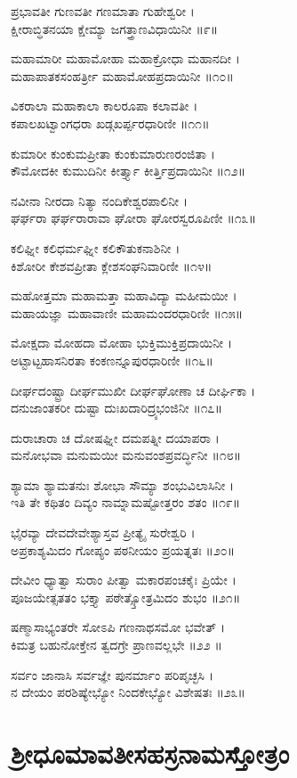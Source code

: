 ಪ್ರಭಾವತೀ ಗುಣವತೀ ಗಣಮಾತಾ ಗುಹೇಶ್ವರೀ ।\\
ಕ್ಷೀರಾಬ್ಧಿತನಯಾ ಕ್ಷೇಮ್ಯಾ ಜಗತ್ತ್ರಾಣವಿಧಾಯಿನೀ ॥೯॥

ಮಹಾಮಾರೀ ಮಹಾಮೋಹಾ ಮಹಾಕ್ರೋಧಾ ಮಹಾನದೀ ।\\
ಮಹಾಪಾತಕಸಂಹರ್ತ್ರೀ ಮಹಾಮೋಹಪ್ರದಾಯಿನೀ ॥೧೦॥

ವಿಕರಾಲಾ ಮಹಾಕಾಲಾ ಕಾಲರೂಪಾ ಕಲಾವತೀ ।\\
ಕಪಾಲಖಟ್ವಾಂಗಧರಾ ಖಡ್ಗಖರ್ಪ್ಪರಧಾರಿಣೀ ॥೧೧॥

ಕುಮಾರೀ ಕುಂಕುಮಪ್ರೀತಾ ಕುಂಕುಮಾರುಣರಂಜಿತಾ ।\\
ಕೌಮೋದಕೀ ಕುಮುದಿನೀ ಕೀರ್ತ್ತ್ಯಾ ಕೀರ್ತ್ತಿಪ್ರದಾಯಿನೀ ॥೧೨॥

ನವೀನಾ ನೀರದಾ ನಿತ್ಯಾ ನಂದಿಕೇಶ್ವರಪಾಲಿನೀ ।\\
ಘರ್ಘರಾ ಘರ್ಘರಾರಾವಾ ಘೋರಾ ಘೋರಸ್ವರೂಪಿಣೀ ॥೧೩॥

ಕಲಿಘ್ನೀ ಕಲಿಧರ್ಮಘ್ನೀ ಕಲಿಕೌತುಕನಾಶಿನೀ ।\\
ಕಿಶೋರೀ ಕೇಶವಪ್ರೀತಾ ಕ್ಲೇಶಸಂಘನಿವಾರಿಣೀ ॥೧೪॥

ಮಹೋತ್ತಮಾ ಮಹಾಮತ್ತಾ ಮಹಾವಿದ್ಯಾ ಮಹೀಮಯೀ ।\\
ಮಹಾಯಜ್ಞಾ ಮಹಾವಾಣೀ ಮಹಾಮಂದರಧಾರಿಣೀ ॥೧೫॥

ಮೋಕ್ಷದಾ ಮೋಹದಾ ಮೋಹಾ ಭುಕ್ತಿಮುಕ್ತಿಪ್ರದಾಯಿನೀ ।\\
ಅಟ್ಟಾಟ್ಟಹಾಸನಿರತಾ ಕಂಕಣನ್ನೂಪುರಧಾರಿಣೀ ॥೧೬॥

ದೀರ್ಘದಂಷ್ಟ್ರಾ ದೀರ್ಘಮುಖೀ ದೀರ್ಘಘೋಣಾ ಚ ದೀರ್ಘಿಕಾ ।\\
ದನುಜಾಂತಕರೀ ದುಷ್ಟಾ ದುಃಖದಾರಿದ್ರ್ಯಭಂಜಿನೀ ॥೧೭॥

ದುರಾಚಾರಾ ಚ ದೋಷಘ್ನೀ ದಮಪತ್ನೀ ದಯಾಪರಾ ।\\
ಮನೋಭವಾ ಮನುಮಯೀ ಮನುವಂಶಪ್ರವರ್ದ್ಧಿನೀ ॥೧೮॥

ಶ್ಯಾಮಾ ಶ್ಯಾಮತನುಃ ಶೋಭಾ ಸೌಮ್ಯಾ ಶಂಭುವಿಲಾಸಿನೀ ।\\
ಇತಿ ತೇ ಕಥಿತಂ ದಿವ್ಯಂ ನಾಮ್ನಾಮಷ್ಟೋತ್ತರಂ ಶತಂ ॥೧೯॥

ಭೈರವ್ಯಾ ದೇವದೇವೇಶ್ಯಾಸ್ತವ ಪ್ರೀತ್ಯೈ ಸುರೇಶ್ವರಿ ।\\
ಅಪ್ರಕಾಶ್ಯಮಿದಂ ಗೋಪ್ಯಂ ಪಠನೀಯಂ ಪ್ರಯತ್ನತಃ ॥೨೦॥

ದೇವೀಂ ಧ್ಯಾತ್ವಾ ಸುರಾಂ ಪೀತ್ವಾ ಮಕಾರಪಂಚಕೈಃ ಪ್ರಿಯೇ ।\\
ಪೂಜಯೇತ್ಸತತಂ ಭಕ್ತ್ಯಾ ಪಠೇತ್ಸ್ತೋತ್ರಮಿದಂ ಶುಭಂ ॥೨೧॥

ಷಣ್ಮಾಸಾಭ್ಯಂತರೇ ಸೋಽಪಿ ಗಣನಾಥಸಮೋ ಭವೇತ್ ।\\
ಕಿಮತ್ರ ಬಹುನೋಕ್ತೇನ ತ್ವದಗ್ರೇ ಪ್ರಾಣವಲ್ಲಭೇ ॥೨೨ ॥

ಸರ್ವಂ ಜಾನಾಸಿ ಸರ್ವಜ್ಞೇ ಪುನರ್ಮಾಂ ಪರಿಪೃಚ್ಛಸಿ ।\\
ನ ದೇಯಂ ಪರಶಿಷ್ಯೇಭ್ಯೋ ನಿಂದಕೇಭ್ಯೋ ವಿಶೇಷತಃ ॥೨೩॥

\section{ಶ್ರೀಧೂಮಾವತೀಸಹಸ್ರನಾಮಸ್ತೋತ್ರಂ}

